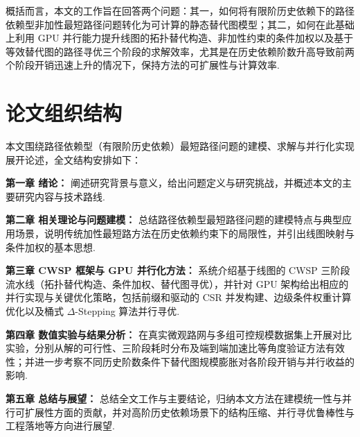 概括而言，本文的工作旨在回答两个问题：其一，如何将有限阶历史依赖下的路径依赖型非加性最短路径问题转化为可计算的静态替代图模型；其二，如何在此基础上利用 GPU 并行能力提升线图的拓扑替代构造、非加性约束的条件加权以及基于等效替代图的路径寻优三个阶段的求解效率，尤其是在历史依赖阶数升高导致前两个阶段开销迅速上升的情况下，保持方法的可扩展性与计算效率.
\section{论文组织结构}

本文围绕路径依赖型（有限阶历史依赖）最短路径问题的建模、求解与并行化实现展开论述，全文结构安排如下：

\textbf{第一章 绪论：} 阐述研究背景与意义，给出问题定义与研究挑战，并概述本文的主要研究内容与技术路线.

\textbf{第二章 相关理论与问题建模：} 总结路径依赖型最短路径问题的建模特点与典型应用场景，说明传统加性最短路方法在历史依赖约束下的局限性，并引出线图映射与条件加权的基本思想.

\textbf{第三章 CWSP 框架与 GPU 并行化方法：} 系统介绍基于线图的 CWSP 三阶段流水线（拓扑替代构造、条件加权、替代图寻优），并针对 GPU 架构给出相应的并行实现与关键优化策略，包括前缀和驱动的 CSR 并发构建、边级条件权重计算优化以及桶式 $\Delta$-Stepping 算法并行寻优.

\textbf{第四章 数值实验与结果分析：} 在真实微观路网与多组可控规模数据集上开展对比实验，分别从解的可行性、三阶段耗时分布及端到端加速比等角度验证方法有效性；并进一步考察不同历史阶数条件下替代图规模膨胀对各阶段开销与并行收益的影响.

\textbf{第五章 总结与展望：} 总结全文工作与主要结论，归纳本文方法在建模统一性与并行可扩展性方面的贡献，并对高阶历史依赖场景下的结构压缩、并行寻优鲁棒性与工程落地等方向进行展望.

